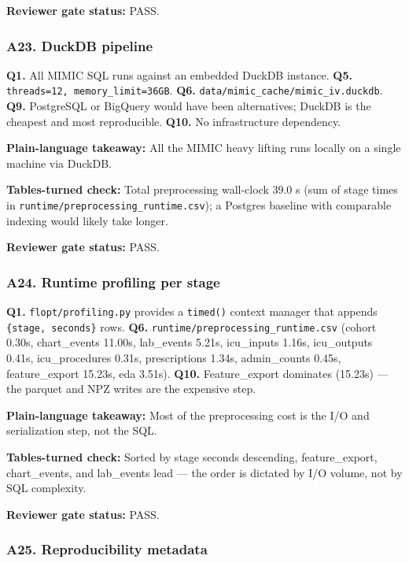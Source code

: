 \documentclass{article}
\begin{document}
\textbf{Reviewer gate status:} PASS.


\subsubsection{A23. DuckDB pipeline}


\textbf{Q1.} All MIMIC SQL runs against an embedded DuckDB instance. \textbf{Q5.} \texttt{threads=12, memory\_limit=36GB}. \textbf{Q6.} \texttt{data/mimic\_cache/mimic\_iv.duckdb}. \textbf{Q9.} PostgreSQL or BigQuery would have been alternatives; DuckDB is the cheapest and most reproducible. \textbf{Q10.} No infrastructure dependency.


\textbf{Plain-language takeaway:} All the MIMIC heavy lifting runs locally on a single machine via DuckDB.


\textbf{Tables-turned check:} Total preprocessing wall-clock 39.0 s (sum of stage times in \texttt{runtime/preprocessing\_runtime.csv}); a Postgres baseline with comparable indexing would likely take longer.


\textbf{Reviewer gate status:} PASS.


\subsubsection{A24. Runtime profiling per stage}


\textbf{Q1.} \texttt{flopt/profiling.py} provides a \texttt{timed()} context manager that appends \texttt{\{stage, seconds\}} rows. \textbf{Q6.} \texttt{runtime/preprocessing\_runtime.csv} (cohort 0.30s, chart\_events 11.00s, lab\_events 5.21s, icu\_inputs 1.16s, icu\_outputs 0.41s, icu\_procedures 0.31s, prescriptions 1.34s, admin\_counts 0.45s, feature\_export 15.23s, eda 3.51s). \textbf{Q10.} Feature\_export dominates (15.23s) --- the parquet and NPZ writes are the expensive step.


\textbf{Plain-language takeaway:} Most of the preprocessing cost is the I/O and serialization step, not the SQL.


\textbf{Tables-turned check:} Sorted by stage seconds descending, feature\_export, chart\_events, and lab\_events lead --- the order is dictated by I/O volume, not by SQL complexity.


\textbf{Reviewer gate status:} PASS.


\subsubsection{A25. Reproducibility metadata}
\end{document}
